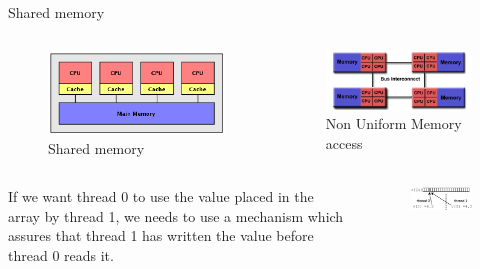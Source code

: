 \documentclass[10pt,times]{beamer}
\begin{document}
\begin{frame}{Shared memory}
\begin{columns}
\begin{figure}
\includegraphics[width=0.7\linewidth]{figs/shared_memory.png}
\caption*{Shared memory}
\end{figure}
\begin{figure}
\includegraphics[width=0.7\linewidth]{figs/numa.png}
\caption*{Non Uniform Memory access}
\end{figure}
\end{columns}
\begin{columns}
If we want thread 0 to use the value placed in the array by thread 1, we needs to 
use a mechanism which assures that thread 1 has written the value before thread 0 
reads it.
\begin{figure}
\includegraphics[width=\linewidth]{figs/shared_memory_vector.png}
\end{figure}
\end{columns}
\end{frame}
\end{document}
